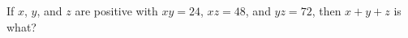 If $x$, $y$, and $z$ are positive with $xy = 24$, $xz = 48$, and $yz = 72$, then $x + y + z$ is what?

